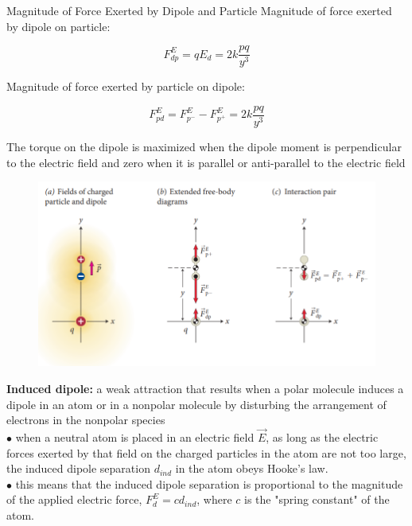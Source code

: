         \begin{axiom}{Magnitude of Force Exerted by Dipole and Particle}
            Magnitude of force exerted by dipole on particle:

            \[
                F^E_{dp} = qE_d = 2k\frac{pq}{y^3}
            \]

            Magnitude of force exerted by particle on dipole:

            \[
                F^E_{pd} = F^E_{p^-} - F^E_{p^+} = 2k \frac{pq}{y^3}
            \]
        \end{axiom}

        The torque on the dipole is maximized when the dipole moment is perpendicular to the electric field and zero when it is parallel or anti-parallel to the electric field

        \begin{figure}[hbt!]
            \centering
            \includegraphics[]{Resources/23.8_Interaction_Between_Dipole_And_Charged_Particle}
        \end{figure}

        \textbf{Induced dipole:} a weak attraction that results when a polar molecule induces a dipole in an atom or in a nonpolar molecule by disturbing the arrangement of electrons in the nonpolar species \\
        $\bullet$ when a neutral atom is placed in an electric field $\vec{E}$, as long as the electric forces exerted by that field on the charged particles in the atom are not too large, the induced dipole separation
        $d_{ind}$ in the atom obeys Hooke's law. \\
        $\bullet$ this means that the induced dipole separation is proportional to the magnitude of the applied electric force, $F^E_d = cd_{ind}$, where $c$ is the "spring constant" of the atom. \\

